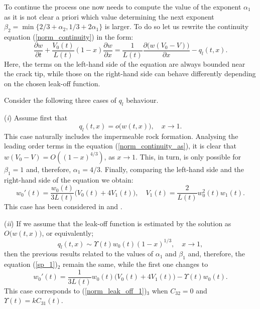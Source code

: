 To continue the process one now needs to compute the value of the exponent $\alpha_1$ as it is not clear
a priori which value determining the next exponent $\beta_2=\min\{2/3+\alpha_2,1/3+2\alpha_1\}$ is larger. To do so
let us rewrite the continuity equation (\ref{norm_continuity}) in the form:
\begin{equation}
\label{norm_continuity_as}
\frac{\partial w}{\partial t}+\frac{V_0(t)}{L( t)}(1-x)\frac{\partial w}{\partial x}=\frac{1}{L( t)}\frac{\partial \big(w(V_0-V)\big)}{\partial x}-q_l(t,x).
\end{equation}
Here, the terms on the left-hand side of the equation are always bounded near the crack tip, while those on the right-hand side can behave differently depending on the chosen leak-off function.


\noindent Consider the following three cases of $q_l$ behaviour.

(\emph{i}) Assume first that
\[
q_l(t,x)=o\big(w(t,x)\big),\quad x\to1.
\]
This case naturally includes the impermeable rock formation. Analysing the leading order terms in the equation (\ref{norm_continuity_as}), it is clear that $w(V_0-V)=O((1-x)^{4/3})$, as $x\to1$. This, in turn, is only possible for $\beta_1=1$ and, therefore, $\alpha_1=4/3$. Finally, comparing the left-hand side and the right-hand side of the equation we obtain:
\begin{equation}
w_{0}'(t)= \frac{w_{0}(t)}{3L(t)} \big(V_0(t)+4V_1(t)\big),\quad V_{1}(t)=\frac{2}{L(t)}w_{0}^{2}(t) w_{1}(t).
\label{sp_1}
\end{equation}
This case has been considered in \cite{Linkov_4} and \cite{MWL}.

\vspace{2mm}


(\emph{ii})
If we assume that the leak-off function is estimated by the solution as  $O\big(w(t,x)\big)$, or equivalently;
\[
q_l(t,x)\sim\Upsilon(t)w_0(t)(1-x)^{1/3},\quad x\to1,
\]
then the previous results related to the values of $\alpha_1$ and $\beta_1$ and, therefore, the equation (\ref{sp_1})$_2$ remain the same, while the first one changes to
\begin{equation}
w_{0}'(t)= \frac{1}{3L(t)} w_{0}(t)\big(V_0(t)+4V_1(t)\big)-\Upsilon(t)w_0(t).
\label{sp_2}
\end{equation}
This case corresponds to (\ref{norm_leak_off_1})$_3$ when $C_{32}=0$ and $\Upsilon(t)=kC_{31}(t)$.

\vspace{2mm}


